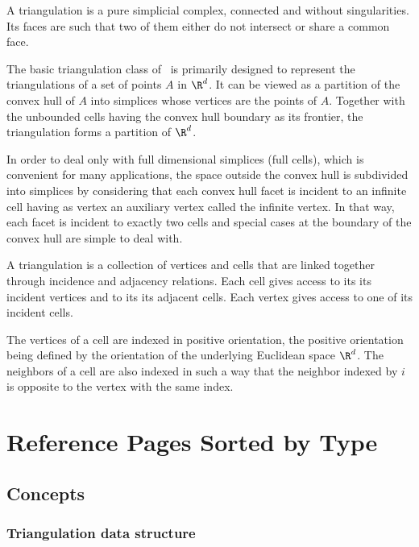 


A triangulation is a pure simplicial complex, connected and without
singularities. Its faces are such that two of them either do not
intersect or share a common face.

The basic triangulation class of \cgal\ is primarily designed to
represent the triangulations of a set of points $A$ in $\R^d$.
 It can be
viewed as a partition of the convex hull of $A$ into simplices whose
vertices are the points of $A$. Together with the unbounded cells having
the convex hull boundary as its frontier, the triangulation forms a
partition of $\R^d$.

In order to deal only with full dimensional simplices (full cells),
 which is convenient for many
applications, the space outside the convex hull is subdivided into simplices by
considering that each convex hull facet is incident to an infinite
cell having as vertex an auxiliary vertex called the infinite
vertex. In that way, each facet is incident to exactly two cells and
special cases at the boundary of the convex hull are simple to deal
with. 

A triangulation is a collection of vertices and cells that are linked
together through incidence and adjacency relations. Each cell gives
access to its its incident vertices and to its its adjacent
cells. Each vertex gives access to one of its incident cells. 

The vertices of a cell are indexed in positive
orientation, the positive orientation being defined by the orientation
of the underlying Euclidean space $\R^d$. The neighbors of a cell are also
indexed  in such a way that the neighbor indexed by $i$
is opposite to the vertex with the same index.



\section{Reference Pages Sorted by Type}

\subsection{Concepts}

\subsubsection*{Triangulation data structure}

